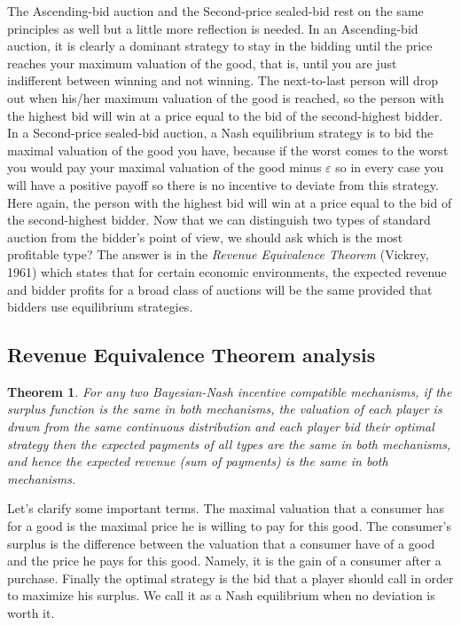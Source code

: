 \documentclass[12pt]{article}
\newtheorem{theorem}{Theorem}
\begin{document}
The Ascending-bid auction and the Second-price sealed-bid rest on the same principles as well but a little more reflection is needed. In an Ascending-bid auction, it is clearly a dominant strategy to stay in the bidding until the price reaches your maximum valuation of the good, that is, until you are just indifferent between winning and not winning. The next-to-last person will drop out when his/her maximum valuation of the good is reached, so the person with the highest bid will win at a price equal to the bid of the second-highest bidder. In a Second-price sealed-bid auction, a Nash equilibrium strategy is to bid the maximal valuation of the good you have, because if the worst comes to the worst you would pay your maximal valuation of the good minus $\varepsilon$ so in every case you will have a positive payoff so there is no incentive to deviate from this strategy. Here again, the person with the highest bid will win at a price equal to the bid of the second-highest bidder. Now that we can distinguish two types of standard auction from the bidder's point of view, we should ask which is the most profitable type? The answer is in the \emph{Revenue Equivalence Theorem} (Vickrey, 1961) which states  that for certain economic environments, the expected revenue and bidder profits for a broad class of auctions will be the same provided that bidders use equilibrium strategies.
\newpage

\subsection{Revenue Equivalence Theorem analysis}

\begin{theorem}
For any two Bayesian-Nash incentive compatible mechanisms, if the surplus function is the same in both mechanisms, the valuation  of each player is drawn from the same continuous distribution and each player bid their optimal strategy then the expected payments of all types are the same in both mechanisms, and hence the expected revenue (sum of payments) is the same in both mechanisms.
\end{theorem}
Let's clarify some important terms. The maximal valuation that a consumer has for a good is the maximal price he is willing to pay for this good. The consumer's surplus is the difference between the valuation that a consumer have of a good and the price he pays for this good. Namely, it is the gain of a consumer after a purchase. Finally the optimal strategy is the bid that a player should call in order to maximize his surplus. We call it as a Nash equilibrium when no deviation is worth it.\\
\end{document}
